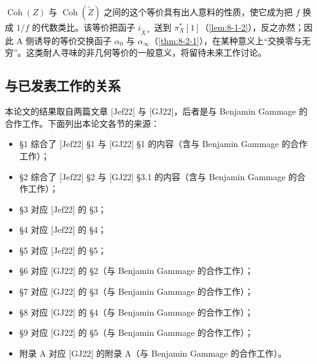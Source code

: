 $\operatorname{Coh}(Z)$ 与 $\operatorname{Coh}(\tilde Z)$ 之间的这个等价具有出人意料的性质，使它成为把 $f$ 换成 $1/f$ 的代数类比。该等价把函子 $i_{\tilde X*}$ 送到 $\pi_X^*[1]$（\ref{lem:8-1-2}），反之亦然；因此 A 侧诱导的等价交换函子 $\alpha_0$ 与 $\alpha_\infty$（\ref{thm:8-2-1}），在某种意义上“交换零与无穷”。这类耐人寻味的非几何等价的一般意义，将留待未来工作讨论。


\subsection{与已发表工作的关系}

本论文的结果取自两篇文章 [Jef22] 与 [GJ22]，后者是与 Benjamin Gammage 的合作工作。下面列出本论文各节的来源：
\begin{itemize}
\item §1 综合了 [Jef22] §1 与 [GJ22] §1 的内容（含与 Benjamin Gammage 的合作工作）；
\item §2 综合了 [Jef22] §2 与 [GJ22] §3.1 的内容（含与 Benjamin Gammage 的合作工作）；
\item §3 对应 [Jef22] 的 §3；
\item §4 对应 [Jef22] 的 §4；
\item §5 对应 [Jef22] 的 §5；
\item §6 对应 [GJ22] 的 §2（与 Benjamin Gammage 的合作工作）；
\item §7 对应 [GJ22] 的 §3（与 Benjamin Gammage 的合作工作）；
\item §8 对应 [GJ22] 的 §4（与 Benjamin Gammage 的合作工作）；
\item §9 对应 [GJ22] 的 §5（与 Benjamin Gammage 的合作工作）；
\item 附录 A 对应 [GJ22] 的附录 A（与 Benjamin Gammage 的合作工作）。
\end{itemize}

